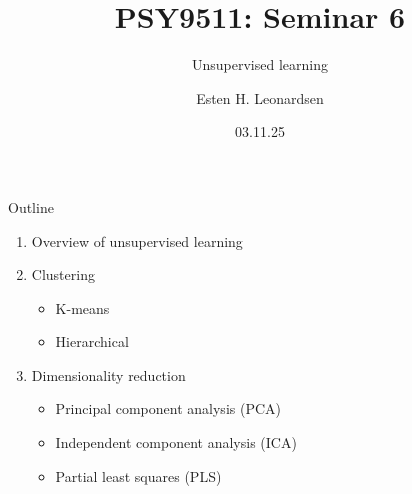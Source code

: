 \documentclass[10pt]{beamer}
\title{PSY9511: Seminar 6}
\subtitle{Unsupervised learning}
\author{Esten H. Leonardsen}
\date{03.11.25}
\begin{document}
	\begin{frame}
	 	\maketitle
	\end{frame}

    \begin{frame}{Outline}
        \begin{enumerate}
            \item Overview of unsupervised learning
            \item Clustering
            \begin{itemize}
                \item K-means
                \item Hierarchical
            \end{itemize}
            \item Dimensionality reduction
            \begin{itemize}
                \item Principal component analysis (PCA)
                \item Independent component analysis (ICA)
                \item Partial least squares (PLS)
            \end{itemize}
        \end{enumerate}
    \end{frame}

    
    
    
\end{document}
